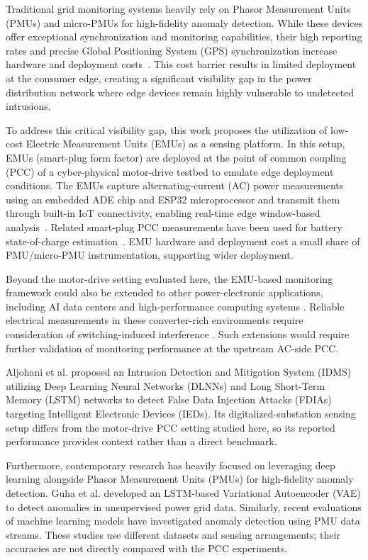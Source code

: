\documentclass[conference,letterpaper]{IEEEtran}
\begin{document}
Traditional grid monitoring systems heavily rely on Phasor Measurement Units (PMUs) and micro-PMUs for high-fidelity anomaly detection. While these devices offer exceptional synchronization and monitoring capabilities, their high reporting rates and precise Global Positioning System (GPS) synchronization increase hardware and deployment costs~\cite{vonmeier2017}. This cost barrier results in limited deployment at the consumer edge, creating a significant visibility gap in the power distribution network where edge devices remain highly vulnerable to undetected intrusions.

To address this critical visibility gap, this work proposes the utilization of low-cost Electric Measurement Units (EMUs) as a sensing platform. In this setup, EMUs (smart-plug form factor) are deployed at the point of common coupling (PCC) of a cyber-physical motor-drive testbed to emulate edge deployment conditions. The EMUs capture alternating-current (AC) power measurements using an embedded ADE chip and ESP32 microprocessor and transmit them through built-in IoT connectivity, enabling real-time edge window-based analysis~\cite{najarEMU2026}. Related smart-plug PCC measurements have been used for battery state-of-charge estimation~\cite{najarSOC2026}. EMU hardware and deployment cost a small share of PMU/micro-PMU instrumentation, supporting wider deployment.

Beyond the motor-drive setting evaluated here, the EMU-based monitoring framework could also be extended to other power-electronic applications, including AI data centers and high-performance computing systems \cite{Habibi2026DataCenters,Lotfi2026FCML}.
Reliable electrical measurements in these converter-rich environments require consideration of switching-induced interference \cite{Omidi2026HybridSensor}.
Such extensions would require further validation of monitoring performance at the upstream AC-side PCC.



Aljohani et al. \cite{aljohani2024} proposed an Intrusion Detection and Mitigation System (IDMS) utilizing Deep Learning Neural Networks (DLNNs) and Long Short-Term Memory (LSTM) networks to detect False Data Injection Attacks (FDIAs) targeting Intelligent Electronic Devices (IEDs). Its digitalized-substation sensing setup differs from the motor-drive PCC setting studied here, so its reported performance provides context rather than a direct benchmark.


Furthermore, contemporary research has heavily focused on leveraging deep learning alongside Phasor Measurement Units (PMUs) for high-fidelity anomaly detection. Guha et al. \cite{guha} developed an LSTM-based Variational Autoencoder (VAE) to detect anomalies in unsupervised power grid data. Similarly, recent evaluations of machine learning models \cite{pmu_lstm_2025} have investigated anomaly detection using PMU data streams. These studies use different datasets and sensing arrangements; their accuracies are not directly compared with the PCC experiments.
\end{document}
